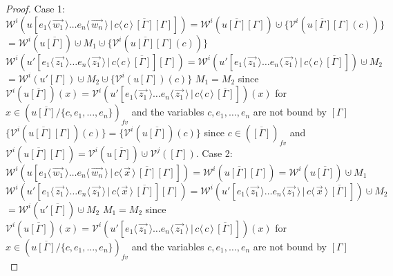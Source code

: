 \documentclass[a4paper,UKenglish,cleveref, autoref]{lipics-v2019}
\newcommand{\fv}[1]{(#1)_{fv}}
\newcommand{\set}[1]{ \{ #1 \} }
\newcommand{\dist}[5]{#1 [ #2 \, \vert \, \fakedist{#4}{#5} \, #3 ]}
\newcommand{\fakedist}[2]{#1 \langle \, #2 \, \rangle}
\newcommand{\weight}[2]{\mathcal{W}^{#1}(#2)}
\newcommand{\weightvar}[2]{\mathcal{V}^{#1}(#2)}
\begin{document}
\begin{proof}
Case 1:
\newline
$\weight{i}{\dist{u}{\fakedist{e_{1}}{\vec{w_{1}}} \dots \fakedist{e_{n}}{\vec{w_{n}}}}{\overline{[\Gamma]} [\Gamma]}{c}{c}} = \weight{i}{u \overline{[\Gamma]}[\Gamma]} \cupdot \set{\weightvar{i}{u\overline{[\Gamma]}[\Gamma](c)}}$
\newline
$= \weight{i}{u\overline{[\Gamma]}} \cupdot M_{1} \cupdot  \set{\weightvar{i}{u\overline{[\Gamma]}[\Gamma](c)}}$
\newline
$\weight{i}{\dist{u'}{\fakedist{e_{1}}{\vec{z_{1}}} \dots \fakedist{e_{n}}{\vec{z_{1}}}}{\overline{[\Gamma]}}{c}{c}[\Gamma]} = \weight{i}{\dist{u'}{\fakedist{e_{1}}{\vec{z_{1}}} \dots \fakedist{e_{n}}{\vec{z_{1}}}}{\overline{[\Gamma]}}{c}{c}} \cupdot M_{2}$
\newline
$= \weight{i}{u'[\Gamma]} \cupdot M_{2} \cupdot \set{\weightvar{i}{u[\Gamma]}(c)}$
\newline
$M_{1} = M_{2}$ since $\weightvar{i}{u \overline{[\Gamma]}}(x) = \weightvar{i}{\dist{u'}{\fakedist{e_{1}}{\vec{z_{1}}} \dots \fakedist{e_{n}}{\vec{z_{1}}}}{\overline{[\Gamma]}}{c}{c}}(x)$ 
\newline
for $x \in \fv{u \overline{[\Gamma]} / \set{c, e_{1}, \dots, e_{n}}}$ and the variables $c, e_{1}, \dots, e_{n}$ are not bound by $[\Gamma]$ 
\newline
$\set{\weightvar{i}{u\overline{[\Gamma]}[\Gamma]}(c)} =  \set{\weightvar{i}{u\overline{[\Gamma]}}(c)}$ since $c \in \fv{\overline{[\Gamma]}}$ and $\weightvar{i}{u\overline{[\Gamma]}[\Gamma]} = \weightvar{i}{u\overline{[\Gamma]}} \cupdot \weightvar{j}{[\Gamma]}$.
\newline
Case 2:
\newline
$\weight{i}{\dist{u}{\fakedist{e_{1}}{\vec{w_{1}}} \dots \fakedist{e_{n}}{\vec{w_{n}}}}{\overline{[\Gamma]} [\Gamma]}{c}{\vec{x}}} = \weight{i}{u\overline{[\Gamma]}[\Gamma]} = \weight{i}{u\overline{[\Gamma]}} \cupdot M_{1}$
\newline
$\weight{i}{\dist{u'}{\fakedist{e_{1}}{\vec{z_{1}}} \dots \fakedist{e_{n}}{\vec{z_{1}}}}{\overline{[\Gamma]}}{c}{\vec{x}}[\Gamma]} = \weight{i}{\dist{u'}{\fakedist{e_{1}}{\vec{z_{1}}} \dots \fakedist{e_{n}}{\vec{z_{1}}}}{\overline{[\Gamma]}}{c}{\vec{x}}} \cupdot M_{2}$
\newline
$= \weight{i}{u'\overline{[\Gamma]}} \cupdot M_{2}$
\newline
$M_{1} = M_{2}$ since $\weightvar{i}{u \overline{[\Gamma]}}(x) = \weightvar{i}{\dist{u'}{\fakedist{e_{1}}{\vec{z_{1}}} \dots \fakedist{e_{n}}{\vec{z_{1}}}}{ \overline{[\Gamma]}}{c}{c}}(x)$ 
\newline
for $x \in \fv{u \overline{[\Gamma]} / \set{c, e_{1}, \dots, e_{n}}}$ and the variables $c, e_{1}, \dots, e_{n}$ are not bound by $[\Gamma]$ 
\end{proof}
\end{document}
